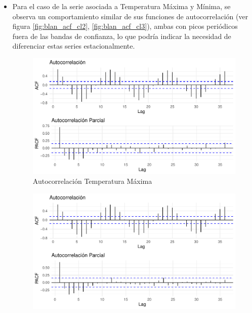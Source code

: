 \documentclass[12pt,oneside]{book}\usepackage[]{graphicx}\usepackage[]{color}
\makeatletter
\def\maxwidth{ %
  \ifdim\Gin@nat@width>\linewidth
    \linewidth
  \else
    \Gin@nat@width
  \fi
}
\newenvironment{knitrout}{}{} %
\theoremstyle{definition} %
\makeatother
\begin{document}
\begin{itemize}
\item Para el caso de la serie asociada a Temperatura Máxima y Mínima, se observa un comportamiento similar de sus funciones de autocorrelación (ver figura \ref{fig:blan_acf_cl2}, \ref{fig:blan_acf_cl3}), ambas con picos periódicos fuera de las bandas de confianza, lo que podría indicar la necesidad de diferenciar estas series estacionalmente.

\begin{knitrout}
\color{fgcolor}\begin{figure}[H]

{\centering \includegraphics[width=\maxwidth]{figure/unnamed-chunk-28-1} 

}

\caption{\label{fig:blan_acf_cl2} Autocorrelación Temperatura Máxima}\label{fig:unnamed-chunk-28}
\end{figure}


\end{knitrout}


\begin{knitrout}
\color{fgcolor}\begin{figure}[H]

{\centering \includegraphics[width=\maxwidth]{figure/unnamed-chunk-29-1} 

}
\end{figure}
\end{knitrout}
\end{itemize}
\end{document}

